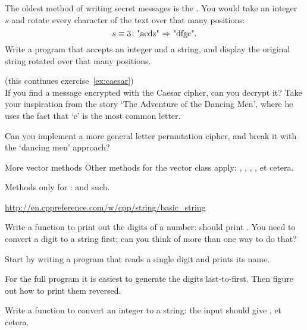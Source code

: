 \begin{exercise}
  \label{ex:caesar}
  The oldest method of writing secret messages is the
  . You would take an integer~$s$ and rotate every character 
  of the text over that many positions:
  \[ s\equiv3\colon \hbox{"acdz" $\Rightarrow$ "dfgc"}. \]
  Write a program that accepts an integer and a string, and display
  the original string rotated over that many positions.
\end{exercise}
\begin{exercise}
  \label{ex:caesar-decrypt}
  (this continues exercise~\ref{ex:caesar})\\
  If you find a message encrypted with the Caesar cipher, can you
  decrypt it? Take your inspiration from the
   story `The Adventure of the Dancing
  Men', where he uses the fact that `e' is the most common letter.

  Can you implement a more general letter permutation cipher, and
  break it with the `dancing men' approach?
\end{exercise}

\begin{block}{More vector methods}
  \label{sl:string-vector-methods}
  Other methods for the vector class apply: , ,
  , , et cetera.

  Methods only for :  and such.

  \url{http://en.cppreference.com/w/cpp/string/basic_string}
\end{block}

\begin{exercise}
  \label{ex:printdigits}
  Write a function to print out the digits of a number:  should
  print .
  You need to convert a digit to a string first; can you think of more
  than one way to do that?

  Start by writing a program that reads a single digit and prints its name.

  For the full program it is easiest to generate the  digits last-to-first.
  Then figure out how to print them reversed.
\end{exercise}

\begin{exercise}
  \label{ex:printnumber}
  Write a function to convert an integer to a string: the input
   should give , et cetera.
\end{exercise}


